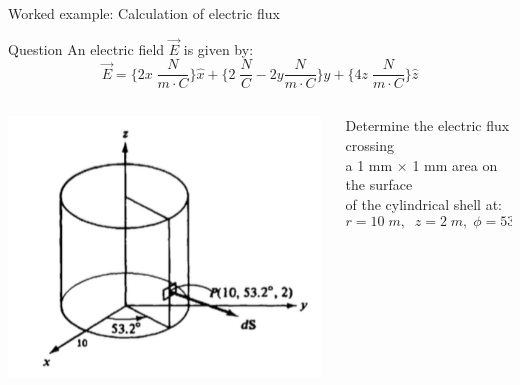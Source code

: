 %
%

{
\problemslide

%
%
%

\begin{frame}{Worked example: Calculation of electric flux}

  \begin{blockexmplque}{Question}
    An electric field $\vec{E}$ is given by:
    \begin{equation*}
     \vec{E} =
      \big\{ 2x \; \frac{N}{m \cdot C} \big\} \hat{x} +
      \big\{ 2 \; \frac{N}{C} - 2y \frac{N}{m \cdot C} \big\} \hat{y} +
      \big\{ 4z \; \frac{N}{m \cdot C} \big\} \hat{z}
    \end{equation*}
    \vspace{-0.3cm}
    \begin{columns}
      \begin{column}{0.47\textwidth}
        \begin{center}
          \includegraphics[width=0.99\textwidth]{./images/problems/lect02_electric_flux_area_on_cylinder.png}\\
        \end{center}
      \end{column}
      \begin{column}{0.53\textwidth}
        Determine the electric flux crossing \\
        a 1 mm $\times$ 1 mm area on the surface \\
        of the cylindrical shell at:
        \begin{equation*}
          r = 10 \; m, \;\; z = 2 \; m, \; \phi = 53.2^{o}
        \end{equation*}
     \end{column}
   \end{columns}
  \end{blockexmplque}
  \vspace{0.4cm}


\end{frame}}
